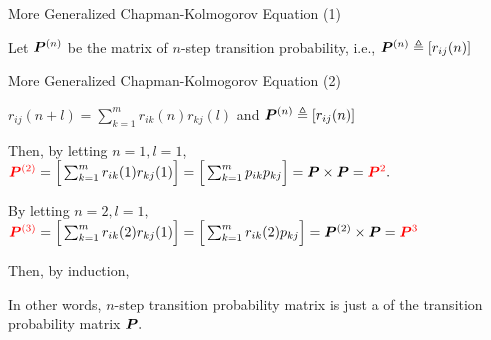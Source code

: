 \begin{frame}{More Generalized Chapman-Kolmogorov Equation (1)}


\plitemsep 0.2in

\bci 

\item {}

\item<7-> Let $\bm{P}^{(n)}$ be the matrix of $n$-step transition
  probability, i.e., $\bm{P}^{(n)} \triangleq [r_{ij}(n)]$

\item<8->  


  \eci 

\end{frame}

\begin{frame}{More Generalized Chapman-Kolmogorov Equation (2)}


\plitemsep 0.1in

\bci 

\item $r_{ij}(n+l) = \sum_{k=1}^m r_{ik}(n) r_{kj}(l)$ and $\bm{P}^{(n)} \triangleq [r_{ij}(n)]$

\item<2-> Then, by letting $n=1, l=1$, ${\color{red} \bm{P}^{(2)}}= \Big[\sum_{k=1}^m r_{ik}(1)
  r_{kj}(1) \Big] = \Big[ \sum_{k=1}^m p_{ik} p_{kj} \Big]=
  \bm{P}\times \bm{P}= {\color{red} \bm{P}^2}.$

\item<3-> By letting $n=2, l=1,$
  ${\color{red} \bm{P}^{(3)}}= \Big[\sum_{k=1}^m r_{ik}(2)
  r_{kj}(1) \Big] = \Big[ \sum_{k=1}^m r_{ik}(2) p_{kj} \Big] =
  \bm{P}^{(2)}\times \bm{P} = {\color{red} \bm{P}^3}$

\item<4-> Then, by induction, 

\item<5-> In other words, $n$-step transition probability matrix is just a
   of the transition probability matrix $\bm{P}.$
  \eci 

\end{frame}

